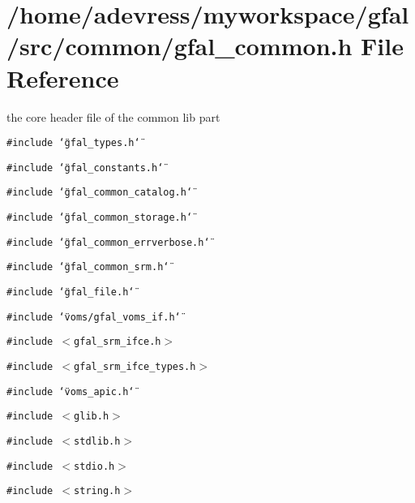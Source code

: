 \section{/home/adevress/myworkspace/gfal/src/common/gfal\_\-common.h File Reference}
\label{gfal__common_8h}
the core header file of the common lib part 

{\tt \#include \char`\"{}gfal\_\-types.h\char`\"{}}\par
{\tt \#include \char`\"{}gfal\_\-constants.h\char`\"{}}\par
{\tt \#include \char`\"{}gfal\_\-common\_\-catalog.h\char`\"{}}\par
{\tt \#include \char`\"{}gfal\_\-common\_\-storage.h\char`\"{}}\par
{\tt \#include \char`\"{}gfal\_\-common\_\-errverbose.h\char`\"{}}\par
{\tt \#include \char`\"{}gfal\_\-common\_\-srm.h\char`\"{}}\par
{\tt \#include \char`\"{}gfal\_\-file.h\char`\"{}}\par
{\tt \#include \char`\"{}voms/gfal\_\-voms\_\-if.h\char`\"{}}\par
{\tt \#include $<$gfal\_\-srm\_\-ifce.h$>$}\par
{\tt \#include $<$gfal\_\-srm\_\-ifce\_\-types.h$>$}\par
{\tt \#include \char`\"{}voms\_\-apic.h\char`\"{}}\par
{\tt \#include $<$glib.h$>$}\par
{\tt \#include $<$stdlib.h$>$}\par
{\tt \#include $<$stdio.h$>$}\par
{\tt \#include $<$string.h$>$}\par
